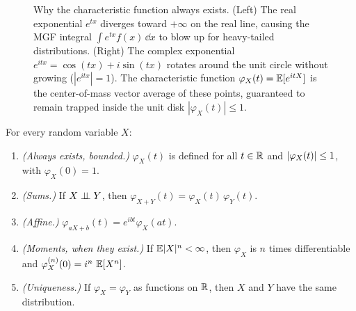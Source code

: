 \begin{figure}[H]
\caption{Why the characteristic function always exists. (Left) The real exponential $e^{tx}$ diverges toward $+\infty$ on the real line, causing the MGF integral $\int e^{tx} f(x)\,\dd x$ to blow up for heavy-tailed distributions. (Right) The complex exponential $e^{itx} = \cos(tx) + i\sin(tx)$ rotates around the unit circle without growing ($|e^{itx}|=1$). The characteristic function $\varphi_X(t) = \operatorname{\mathbb{E}}[e^{itX}]$ is the center-of-mass vector average of these points, guaranteed to remain trapped inside the unit disk $|\varphi_X(t)| \le 1$.}
\label{ch18:fig-complex-rotation}
\end{figure}

\begin{theorem}
\label{ch18:thm-cf-props}
For every random variable $X$:
\begin{enumerate}
  \item \emph{(Always exists, bounded.)} $\varphi_X(t)$ is defined for all
        $t\in\mathbb{R}$ and $\lvert\varphi_X(t)\rvert\le 1$, with $\varphi_X(0)=1$.
  \item \emph{(Sums.)} If $X\perp\!\!\!\perp Y$, then
        $\varphi_{X+Y}(t)=\varphi_X(t)\,\varphi_Y(t)$.
  \item \emph{(Affine.)} $\varphi_{aX+b}(t)=e^{ibt}\varphi_X(at)$.
  \item \emph{(Moments, when they exist.)} If $\operatorname{\mathbb{E}}\lvert X\rvert^n<\infty$, then
        $\varphi_X$ is $n$ times differentiable and
        $\varphi_X^{(n)}(0)=i^n\,\operatorname{\mathbb{E}}[X^n]$.
  \item \emph{(Uniqueness.)} If $\varphi_X=\varphi_Y$ as functions on $\mathbb{R}$, then
        $X$ and $Y$ have the same distribution.
\end{enumerate}
\end{theorem}

